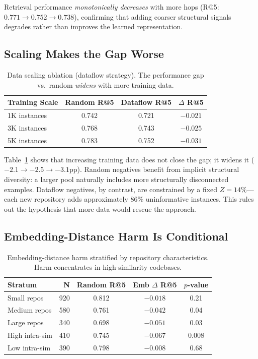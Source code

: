 \documentclass[11pt]{article}
\begin{document}
Retrieval performance \emph{monotonically decreases} with more hops (R@5: $0.771 \to 0.752 \to 0.738$), confirming that adding coarser structural signals degrades rather than improves the learned representation.

\subsection{Scaling Makes the Gap Worse}

\begin{table}[t]
\centering
\caption{Data scaling ablation (dataflow strategy). The performance gap vs.\ random \emph{widens} with more training data.}
\label{tab:scaling}
\begin{tabular}{lccc}
\toprule
\textbf{Training Scale} & \textbf{Random R@5} & \textbf{Dataflow R@5} & \textbf{$\Delta$ R@5} \\
\midrule
1K instances & 0.742 & 0.721 & $-0.021$ \\
3K instances & 0.768 & 0.743 & $-0.025$ \\
5K instances & 0.783 & 0.752 & $-0.031$ \\
\bottomrule
\end{tabular}
\end{table}

Table~\ref{tab:scaling} shows that increasing training data does not close the gap; it widens it ($-2.1 \to -2.5 \to -3.1$pp). Random negatives benefit from implicit structural diversity: a larger pool naturally includes more structurally disconnected examples. Dataflow negatives, by contrast, are constrained by a fixed $Z = 14\%$---each new repository adds approximately 86\% uninformative instances. This rules out the hypothesis that more data would rescue the approach.

\subsection{Embedding-Distance Harm Is Conditional}

\begin{table}[t]
\centering
\caption{Embedding-distance harm stratified by repository characteristics. Harm concentrates in high-similarity codebases.}
\label{tab:emb_harm}
\begin{tabular}{lrccc}
\toprule
\textbf{Stratum} & \textbf{N} & \textbf{Random R@5} & \textbf{Emb $\Delta$ R@5} & \textbf{$p$-value} \\
\midrule
Small repos       & 920 & 0.812 & $-0.018$ & 0.21 \\
Medium repos      & 580 & 0.761 & $-0.042$ & 0.04 \\
Large repos       & 340 & 0.698 & $-0.051$ & 0.03 \\
High intra-sim    & 410 & 0.745 & $-0.067$ & 0.008 \\
Low intra-sim     & 390 & 0.798 & $-0.008$ & 0.68 \\
\bottomrule
\end{tabular}
\end{table}
\end{document}
